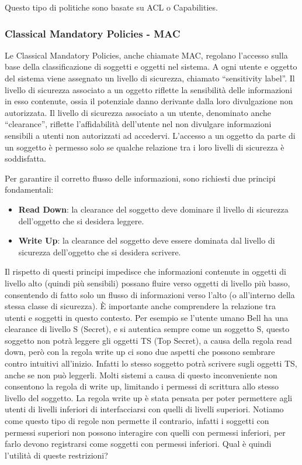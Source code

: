             Questo tipo di politiche sono basate su ACL o Capabilities.
            
        \subsubsection{Classical Mandatory Policies - MAC}
            Le Classical Mandatory Policies, anche chiamate MAC, regolano l'accesso sulla base della classificazione di soggetti e oggetti nel sistema. A ogni utente e oggetto del sistema viene assegnato un livello di sicurezza, chiamato “sensitivity label”. Il livello di sicurezza associato a un oggetto riflette la sensibilità delle informazioni in esso contenute, ossia il potenziale danno derivante dalla loro divulgazione non autorizzata. Il livello di sicurezza associato a un utente, denominato anche “clearance”, riflette l'affidabilità dell'utente nel non divulgare informazioni sensibili a utenti non autorizzati ad accedervi. L'accesso a un oggetto da parte di un soggetto è permesso solo se qualche relazione tra i loro livelli di sicurezza è soddisfatta.

            Per garantire il corretto flusso delle informazioni, sono richiesti due principi fondamentali:

            \begin{itemize}
                \item \textbf{Read Down}: la clearance del soggetto deve dominare il livello di sicurezza dell'oggetto che si desidera leggere.
                \item \textbf{Write Up}: la clearance del soggetto deve essere dominata dal livello di sicurezza dell'oggetto che si desidera scrivere.
            \end{itemize}

            Il rispetto di questi principi impedisce che informazioni contenute in oggetti di livello alto (quindi più sensibili) possano fluire verso oggetti di livello più basso, consentendo di fatto solo un flusso di informazioni verso l'alto (o all'interno della stessa classe di sicurezza). È importante anche comprendere la relazione tra utenti e soggetti in questo contesto. Per esempio se l'utente umano Bell ha una clearance di livello S (Secret), e si autentica sempre come un soggetto S, questo soggetto non potrà leggere gli oggetti TS (Top Secret), a causa della regola read down, però con la regola write up ci sono due aspetti che possono sembrare contro intuitivi all'inizio. Infatti lo stesso soggetto potrà scrivere sugli oggetti TS, anche se non può leggerli. Molti sistemi a causa di questo inconveniente non consentono la regola di write up, limitando i permessi di scrittura allo stesso livello del soggetto. La regola write up è stata pensata per poter permettere agli utenti di livelli inferiori di interfacciarsi con quelli di livelli superiori. Notiamo come questo tipo di regole non permette il contrario, infatti i soggetti con permessi superiori non possono interagire con quelli con permessi inferiori, per farlo devono registrarsi come soggetti con permessi inferiori. Qual è quindi l'utilità di queste restrizioni?
    
